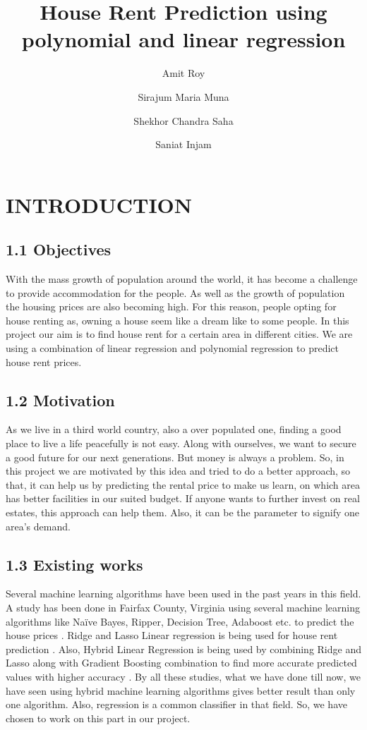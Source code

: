 \documentclass[conference]{IEEEtran}[10]
\begin{document}
\title{House Rent Prediction using polynomial and linear regression}
\author[1]{ Amit Roy
}

\author[2]{ Sirajum Maria Muna
}

\author[3]{ Shekhor Chandra Saha
}

\author[4]{ Saniat Injam
}

\maketitle
\IEEEpubidadjcol
\section{INTRODUCTION}
\subsection{1.1 Objectives}
With the mass growth of population around the world, it has become a challenge to provide accommodation for the people. As well as the growth of population the housing prices are also becoming high. For this reason, people opting for house renting as, owning a house seem like a dream like to some people. In this project our aim is to find house rent for a certain area in different cities. We are using a combination of linear regression and polynomial regression to predict house rent prices. 
\subsection{1.2 Motivation}
As we live in a third world country, also a over populated one, finding a good place to live a life peacefully is not easy. Along with ourselves, we want to secure a good future for our next generations. But money is always a problem. So, in this project we are motivated by this idea and tried to do a better approach, so that, it can help us by predicting the rental price to make us learn, on which area has better facilities in our suited budget. If anyone wants to further invest on real estates, this approach can help them. Also, it can be the parameter to signify one area’s demand.
\subsection*{1.3 Existing works}
Several machine learning algorithms have been used in the past years in this field. A study has been done in Fairfax County, Virginia using several machine learning algorithms like Naïve Bayes, Ripper, Decision Tree, Adaboost etc. to predict the house prices \cite{park2015using}.
Ridge and Lasso Linear regression is being used for house rent prediction \cite{kumar2019house}.
Also, Hybrid Linear Regression is being used by combining Ridge and Lasso along with Gradient Boosting combination to find more accurate predicted values with higher accuracy \cite{c3}.
By all these studies, what we have done till now, we have seen using hybrid machine learning algorithms gives better result than only one algorithm. Also, regression is a common classifier in that field. So, we have chosen to work on this part in our project.
\end{document}
